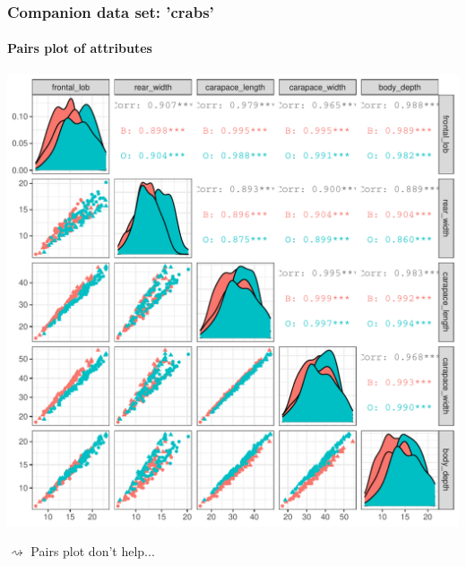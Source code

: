 \begin{frame}[fragile]
  \frametitle{Companion data set: 'crabs'}
  \framesubtitle{Pairs plot of attributes}

\begin{knitrout}
\color{fgcolor}\begin{kframe}
\begin{alltt}
  \hlstd{=} \hlopt{:}\hlstd{,} \hlstd{(}   
\end{alltt}
\end{kframe}
\includegraphics[width=\maxwidth]{figure/crabs_attributes-1} 

\end{knitrout}
$\rightsquigarrow$ Pairs plot don't help...
\end{frame}

